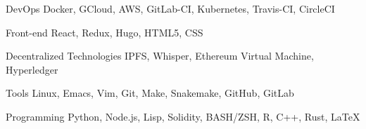 

\begin{cvskills}

  \cvskill
    {DevOps} %
    {Docker, GCloud, AWS, GitLab-CI, Kubernetes, Travis-CI, CircleCI} %

  \cvskill
    {Front-end} %
    {React, Redux, Hugo, HTML5, CSS} %

  \cvskill
    {Decentralized Technologies} %
    {IPFS, Whisper, Ethereum Virtual Machine, Hyperledger} %

  \cvskill
    {Tools} %
    {Linux, Emacs, Vim, Git, Make, Snakemake,  GitHub, GitLab} %

  \cvskill
    {Programming} %
    {Python, Node.js, Lisp, Solidity, BASH/ZSH, R, C++, Rust, LaTeX} %


\end{cvskills}
